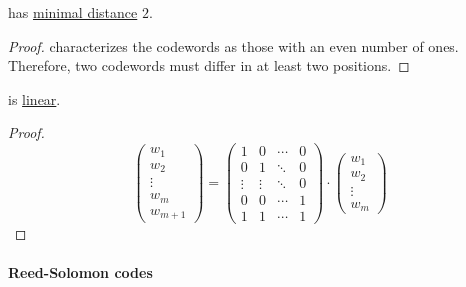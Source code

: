 \begin{corollary}\label{thm:parity_check_distance}
   has \hyperref[def:error_correcting_code/distance]{minimal distance} \( 2 \).
\end{corollary}
\begin{proof}
   characterizes the codewords as those with an even number of ones. Therefore, two codewords must differ in at least two positions.
\end{proof}

\begin{proposition}\label{thm:parity_check_linearity}
   is \hyperref[def:error_correcting_code/linear]{linear}.
\end{proposition}
\begin{proof}
  \begin{equation*}
    \begin{pmatrix}
      w_1 \\
      w_2 \\
      \vdots \\
      w_m \\
      w_{m+1}
    \end{pmatrix}
    =
    \begin{pmatrix}
      1      & 0      & \cdots & 0 \\
      0      & 1      & \ddots & 0 \\
      \vdots & \vdots & \ddots & 0 \\
      0      & 0      & \cdots & 1 \\
      1      & 1      & \cdots & 1
    \end{pmatrix}
    \cdot
    \begin{pmatrix}
      w_1 \\
      w_2 \\
      \vdots \\
      w_m
    \end{pmatrix}
  \end{equation*}
\end{proof}

\paragraph{Reed-Solomon codes}

